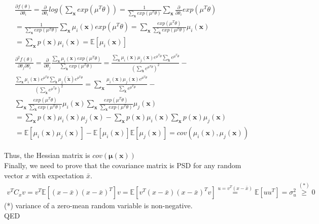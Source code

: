 \documentclass[11pt]{article}
\begin{document}
\begin{align*}
	\begin{split}
		\frac{\partial f(\theta)}{\partial \theta_{i}} = \frac{\partial}{\partial \theta_i}log\left(\sum_{\boldsymbol{x}}exp(\mu^T\theta)\right) = \frac{1}{\sum_{\boldsymbol{x}}exp(\mu^T\theta)}\sum_{\boldsymbol{x}}\frac{\partial}{\partial \theta_{i}}exp(\mu^T\theta) \\ = \frac{1}{\sum_{\boldsymbol{x}}exp(\mu^T\theta)}\sum_{\boldsymbol{x}}\mu_{i}(\boldsymbol{x})exp(\mu^T\theta) =\sum_{\boldsymbol{x}} \frac{exp(\mu^T\theta)}{\sum_{\boldsymbol{\tilde{x}}}exp(\mu^T\theta)}\mu_{i}(\boldsymbol{x})\\
		= \sum_{\boldsymbol{x}}p(\boldsymbol{x})\mu_{i}(\boldsymbol{x}) = \mathds{E}[\mu_{i}(\boldsymbol{x})]
	\end{split}\\
	\begin{split}
		\frac{\partial ^2f(\theta)}{\partial \theta_j \partial \theta_i} = \frac{\partial}{\partial \theta_{j}} \frac{\sum_{\boldsymbol{x}}\mu_{i}(\boldsymbol{x})exp(\mu^T\theta)}{\sum_{\boldsymbol{\tilde{x}}}exp(\mu^T\theta)} = \frac{\sum_{\boldsymbol{x}}\mu_{i}(\boldsymbol{x})\mu_{j}(\boldsymbol{x})e^{\mu^T\theta}\sum_{\boldsymbol{\tilde{x}}}e^{\mu^T\theta}}{(\sum_{\boldsymbol{\tilde{x}}}e^{\mu^T\theta})^2} - \\  \frac{\sum_{\boldsymbol{x}}\mu_{i}(\boldsymbol{x})e^{\mu^T\theta}\sum_{\boldsymbol{\tilde{x}}}\mu_{j}(\boldsymbol{\tilde{x}})e^{\mu^T\theta}}{(\sum_{\boldsymbol{\tilde{x}}}e^{\mu^T\theta})^2}  = \sum_{\boldsymbol{x}}\frac{\mu_{i}(\boldsymbol{x})\mu_{j}(\boldsymbol{x})e^{\mu^T\theta}}{\sum_{\boldsymbol{\tilde{x}}}e^{\mu^T\theta}} - \\
		\sum_{\boldsymbol{x}} \frac{exp(\mu^T\theta)}{\sum_{\boldsymbol{\tilde{x}}}exp(\mu^T\theta)}\mu_{i}(\boldsymbol{x}) \sum_{\boldsymbol{x}} \frac{exp(\mu^T\theta)}{\sum_{\boldsymbol{\tilde{x}}}exp(\mu^T\theta)}\mu_{j}(\boldsymbol{x}) \\ = \sum_{\boldsymbol{x}}p(\boldsymbol{x})\mu_{i}(\boldsymbol{x})\mu_{j}(\boldsymbol{x}) - \sum_{\boldsymbol{x}}p(\boldsymbol{x})\mu_{i}(\boldsymbol{x}) \sum_{\boldsymbol{x}}p(\boldsymbol{x})\mu_{j}(\boldsymbol{x}) \\ = \mathds{E}[\mu_{i}(\boldsymbol{x})\mu_{j}(\boldsymbol{x})] - \mathds{E}[\mu_{i}(\boldsymbol{x})]\mathds{E}[\mu_{j}(\boldsymbol{x})] = cov(\mu_{i}(\boldsymbol{x}), \mu_{j}(\boldsymbol{x}))
	\end{split}
\end{align*}

Thus, the Hessian matrix is $cov(\boldsymbol{\mu}(\boldsymbol{x}))$ \\
Finally, we need to prove that the covariance matrix is PSD for any random vector $x$ with expectation $\bar{x}$.
\begin{align*}
	v^TC_xv = v^T\mathds{E}[(x-\bar{x})(x-\bar{x})^T]v =\mathds{E}[v^T(x-\bar{x})(x-\bar{x})^Tv] \overset{u=v^T(x-\bar{x})}{=} \mathds{E}[uu^T] = \sigma_u^2 \overset{(*)}{\ge} 0
\end{align*}
(*) variance of a zero-mean random variable is non-negative.\\
QED
\end{document}

